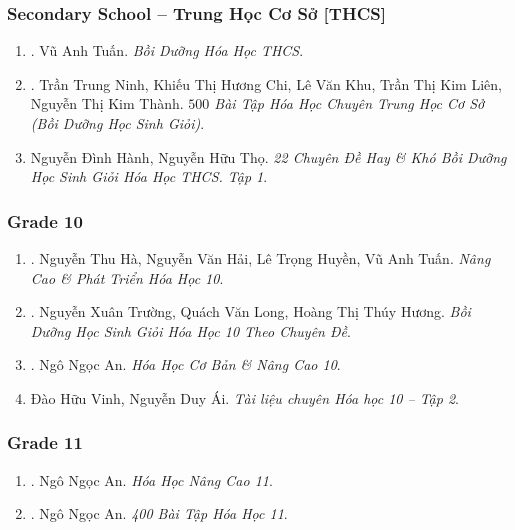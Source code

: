 \documentclass{article}
\begin{document}
\subsubsection{Secondary School -- Trung Học Cơ Sở [THCS]}

\begin{enumerate}
	\item \cite{Tuan2022}. Vũ Anh Tuấn. \textit{Bồi Dưỡng Hóa Học THCS}.\hfill{\sf[bought]}
	\item \cite{Ninh_Chi_Khu_Lien_Thanh2019}. Trần Trung Ninh, Khiếu Thị Hương Chi, Lê Văn Khu, Trần Thị Kim Liên, Nguyễn Thị Kim Thành. \textit{$500$ Bài Tập Hóa Học Chuyên Trung Học Cơ Sở (Bồi Dưỡng Học Sinh Giỏi)}.\hfill{\sf[bought]}
	\item Nguyễn Đình Hành, Nguyễn Hữu Thọ. \textit{22 Chuyên Đề Hay \& Khó Bồi Dưỡng Học Sinh Giỏi Hóa Học THCS. Tập 1}.
\end{enumerate}

\subsubsection{Grade 10}

\begin{enumerate}
	\item \cite{Ha_Hai_Huyen_Tuan2022}. Nguyễn Thu Hà, Nguyễn Văn Hải, Lê Trọng Huyền, Vũ Anh Tuấn. \textit{Nâng Cao \& Phát Triển Hóa Học 10}.\hfill{\sf[bought]}
	\item \cite{Truong_Long_Huong_bdhsg_Hoa_Hoc_10}. Nguyễn Xuân Trường, Quách Văn Long, Hoàng Thị Thúy Hương. \textit{Bồi Dưỡng Học Sinh Giỏi Hóa Học 10 Theo Chuyên Đề}.\hfill{\sf[bought]}
	\item \cite{An_Hoa_Hoc_co_ban_nang_cao_10}. Ngô Ngọc An. \textit{Hóa Học Cơ Bản \& Nâng Cao 10}.\hfill{\sf[bought]}
	\item Đào Hữu Vinh, Nguyễn Duy Ái. \textit{Tài liệu chuyên Hóa học 10 -- Tập 2}.\hfill{\sf[bought]}
\end{enumerate}

\subsubsection{Grade 11}

\begin{enumerate}
	\item \cite{An_Hoa_Hoc_nang_cao_11}. Ngô Ngọc An. \textit{Hóa Học Nâng Cao 11}.\hfill{\sf[bought]}
	\item \cite{An_400_BT_Hoa_Hoc_11}. Ngô Ngọc An. \textit{400 Bài Tập Hóa Học 11}.\hfill{\sf[bought]}
\end{enumerate}
\end{document}
